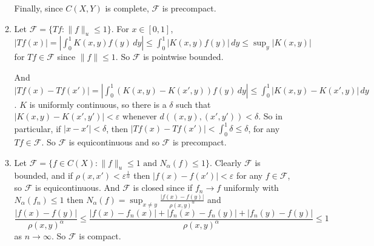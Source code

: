 \documentclass{article}
\newcommand\F{\mathscr F}
\begin{document}
\begin{enumerate}
\begin{enumerate}
           Finally, since $C(X,Y)$ is complete, $\F$ is precompact.

        \item Let $\F = \{Tf : \|f\|_u \leq 1\}$. For $x \in [0,1]$, $|Tf(x)| =
           |\int_0^1 K(x,y)f(y)\,dy| \leq \int_0^1 |K(x,y)f(y)|\,dy \leq \sup_y
           |K(x,y)|$ for $Tf \in \F$ since $\|f\| \leq 1$. So $\F$ is pointwise
           bounded.

           And $|Tf(x) - Tf(x')| = |\int_0^1 (K(x,y)-K(x',y))f(y)\,dy| \leq
           \int_0^1 |K(x,y)-K(x',y)|\,dy$. $K$ is uniformly continuous, so there
           is a $\delta$ such that $|K(x,y)-K(x',y')| < \varepsilon$ whenever
           $d( (x,y), (x',y')) < \delta$. So in particular, if $|x-x'| <
           \delta$, then $|Tf(x) - Tf(x')| < \int_0^1 \delta \leq \delta$, for
           any $Tf \in \F$. So $\F$ is equicontinuous and so $\F$ is precompact.

        \item Let $\F = \{f \in C(X) : \|f\|_u \leq 1 \textrm{ and } N_\alpha(f)
           \leq 1\}$. Clearly $\F$ is bounded, and if $\rho(x,x') <
           \varepsilon^{\frac1\alpha}$ then $|f(x) - f(x')| < \varepsilon$ for
           any $f \in \F$, so $\F$ is equicontinuous. And $\F$ is closed since
           if $f_n \to f$ uniformly with $N_\alpha(f_n)\leq1$ then $N_\alpha(f)
           = \sup_{x \neq y} \frac{|f(x)-f(y)|}{\rho(x,y)^\alpha}$ and
           \[\frac{|f(x)-f(y)|}{\rho(x,y)^\alpha} \leq \frac{|f(x) - f_n(x)| +
           |f_n(x) - f_n(y)| + |f_n(y) - f(y)|}{\rho(x,y)^\alpha} \leq 1\] as $n
           \to \infty$. So $\F$ is compact.
     \end{enumerate}

\end{enumerate}
\end{document}
